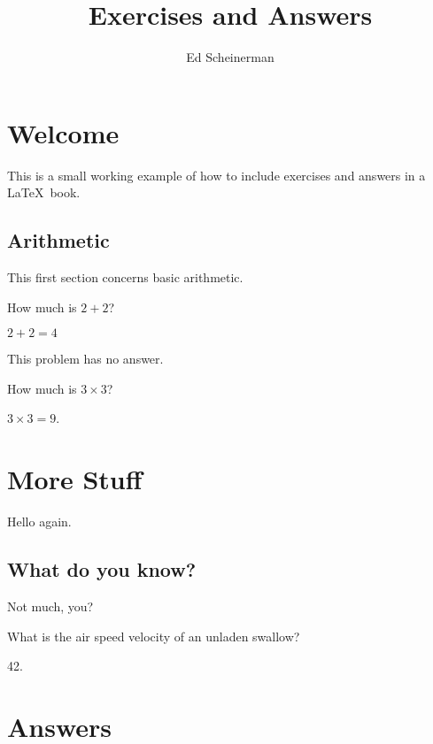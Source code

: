 \documentclass{book}
\title{Exercises and Answers}
\author{Ed Scheinerman}
\date{}
\begin{document}
\maketitle

\tableofcontents

\mainmatter

\chapter{Welcome}
This is a small working example of how to include exercises and
answers in a \LaTeX\ book. 

\section{Arithmetic}

This first section concerns basic arithmetic.

\begin{exercises}

\item How much is $2+2$?
  \begin{answer}
    $2+2= 4$ 
  \end{answer}

\item This problem has no answer.


\item How much is $3\times 3$? 
  \begin{answer}
    $3\times3 = 9$. 
  \end{answer}
\end{exercises}


\chapter{More Stuff}

Hello again.

\section{What do you know?}

Not much, you?

\begin{exercises}
\item What is the air speed velocity of an unladen swallow?

  \begin{answer}
    42.
  \end{answer}
\end{exercises}



\CloseMagicAnswerFile


\backmatter

\clearpage
\chapter*{Answers}

\end{document}
